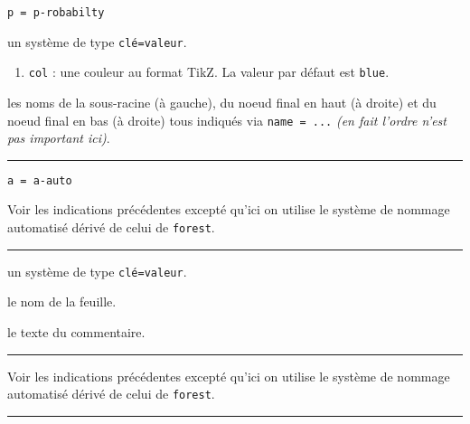 \documentclass[12pt,a4paper]{article}
\theoremstyle{definition}
\newcommand\separation{
	\medskip
	\hfill\rule{0.5\textwidth}{0.75pt}\hfill
	\medskip
}
\newcommand\extraspace{
	\vspace{0.25em}
}
\newcommand\mwhyprefix[2]{%
	\texttt{#1 = #1-#2}%
}
\begin{document}
 \hfill \mwhyprefix{p}{robabilty}

\IDoption{} un système de type \texttt{clé=valeur}.

\begin{enumerate}
	\item \verb#col# : une couleur au format TikZ. La valeur par défaut est \verb#blue#.
\end{enumerate}


 les noms de la sous-racine (à gauche), du noeud final en haut (à droite) et du noeud final en bas (à droite) tous indiqués via \verb#name = ...# \emph{(en fait l'ordre n'est pas important ici)}.


\separation


 \hfill \mwhyprefix{a}{auto}

\extraspace
\extraspace

Voir les indications précédentes excepté qu'ici on utilise le système de nommage automatisé dérivé de celui de \verb#forest#.


\separation



\IDoption{} un système de type \texttt{clé=valeur}.


 le nom de la feuille.

 le texte du commentaire.


\separation



\extraspace
\extraspace

Voir les indications précédentes excepté qu'ici on utilise le système de nommage automatisé dérivé de celui de \verb#forest#.


\separation


\end{document}
